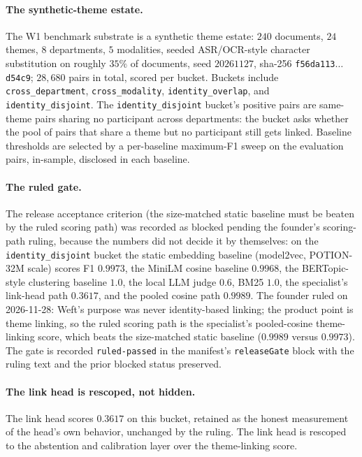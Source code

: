 \documentclass{article}
\begin{document}
\paragraph{The synthetic-theme estate.}
The W1 benchmark substrate is a synthetic theme estate: $240$ documents, $24$ themes, $8$ departments, $5$ modalities, seeded ASR/OCR-style character substitution on roughly $35\%$ of documents, seed $20261127$, sha-256 \texttt{f56da113$\ldots$d54c9}; $28{,}680$ pairs in total, scored per bucket. Buckets include \texttt{cross\_department}, \texttt{cross\_modality}, \texttt{identity\_overlap}, and \texttt{identity\_disjoint}. The \texttt{identity\_disjoint} bucket's positive pairs are same-theme pairs sharing no participant across departments: the bucket asks whether the pool of pairs that share a theme but no participant still gets linked. Baseline thresholds are selected by a per-baseline maximum-F1 sweep on the evaluation pairs, in-sample, disclosed in each baseline.

\paragraph{The ruled gate.}
The release acceptance criterion (the size-matched static baseline must be beaten by the ruled scoring path) was recorded as blocked pending the founder's scoring-path ruling, because the numbers did not decide it by themselves: on the \texttt{identity\_disjoint} bucket the static embedding baseline (model2vec, POTION-32M scale) scores F1 $0.9973$, the MiniLM cosine baseline $0.9968$, the BERTopic-style clustering baseline $1.0$, the local LLM judge $0.6$, BM25 $1.0$, the specialist's link-head path $0.3617$, and the pooled cosine path $0.9989$. The founder ruled on 2026-11-28: Weft's purpose was never identity-based linking; the product point is theme linking, so the ruled scoring path is the specialist's pooled-cosine theme-linking score, which beats the size-matched static baseline ($0.9989$ versus $0.9973$). The gate is recorded \texttt{ruled-passed} in the manifest's \texttt{releaseGate} block with the ruling text and the prior blocked status preserved.

\paragraph{The link head is rescoped, not hidden.}
The link head scores $0.3617$ on this bucket, retained as the honest measurement of the head's own behavior, unchanged by the ruling. The link head is rescoped to the abstention and calibration layer over the theme-linking score.
\end{document}
